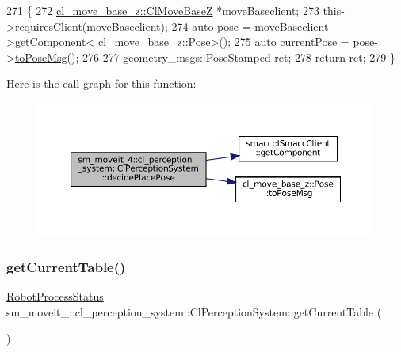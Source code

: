 \begin{DoxyCode}
271             \{
272                 \hyperlink{classcl__move__base__z_1_1ClMoveBaseZ}{cl\_move\_base\_z::ClMoveBaseZ} *moveBaseclient;
273                 this->\hyperlink{classsmacc_1_1ISmaccClient_a7a9990a2f3e35d547671188d69fee520}{requiresClient}(moveBaseclient);
274                 \textcolor{keyword}{auto} pose = moveBaseclient->\hyperlink{classsmacc_1_1ISmaccClient_adef78db601749ca63c19e74a27cb88cc}{getComponent}<
      \hyperlink{classcl__move__base__z_1_1Pose}{cl\_move\_base\_z::Pose}>();
275                 \textcolor{keyword}{auto} currentPose = pose->\hyperlink{classcl__move__base__z_1_1Pose_a9faf8c6b437ff6b19c8bddd692908dca}{toPoseMsg}();
276 
277                 geometry\_msgs::PoseStamped ret;
278                 \textcolor{keywordflow}{return} ret;
279             \}
\end{DoxyCode}
Here is the call graph for this function\+:
\nopagebreak
\begin{figure}[H]
\begin{center}
\leavevmode
\includegraphics[width=350pt]{classsm__moveit__4_1_1cl__perception__system_1_1ClPerceptionSystem_ab2431f4f2f48fc474e7b2f868bdec60d_cgraph}
\end{center}
\end{figure}
\mbox{\label{classsm__moveit__4_1_1cl__perception__system_1_1ClPerceptionSystem_aa08e0d656ca31a618c0a4c496afe36af}} 
\subsubsection{\texorpdfstring{get\+Current\+Table()}{getCurrentTable()}}
{\footnotesize\ttfamily \hyperlink{namespacesm__moveit__4_1_1cl__perception__system_a11dfa58fc66f2d368b894a9f1fec870e}{Robot\+Process\+Status} sm\+\_\+moveit\+\_\+::cl\+\_\+perception\+\_\+system\+::\+Cl\+Perception\+System\+::get\+Current\+Table (\begin{DoxyParamCaption}{ }\end{DoxyParamCaption})\hspace{0.3cm}{\ttfamily [inline]}}



